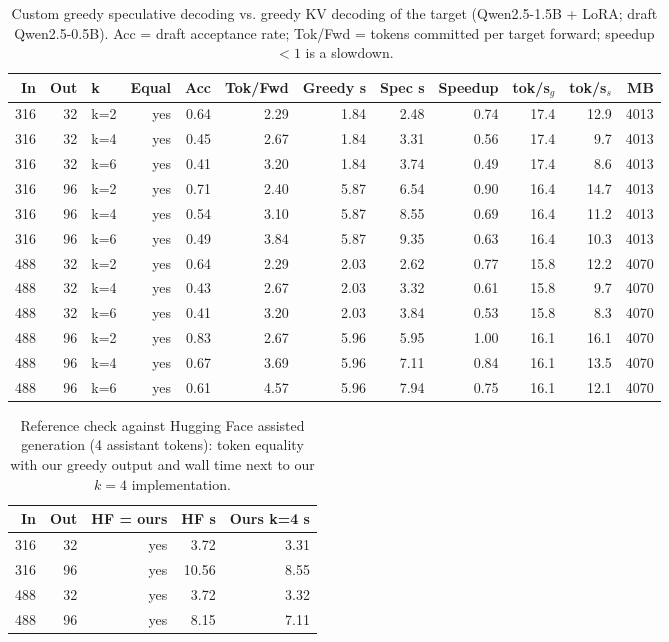 \begin{table}[t]
\centering
\caption{Custom greedy speculative decoding vs. greedy KV decoding of the target (Qwen2.5-1.5B + LoRA; draft Qwen2.5-0.5B). Acc = draft acceptance rate; Tok/Fwd = tokens committed per target forward; speedup $<1$ is a slowdown.}
\label{tab:spec}
\footnotesize
\begin{tabular}{rrlrrrrrrrrr}
\toprule
In & Out & k & Equal & Acc & Tok/Fwd & Greedy s & Spec s & Speedup & tok/s$_g$ & tok/s$_s$ & MB \\
\midrule
316 & 32 & k=2 & yes & 0.64 & 2.29 & 1.84 & 2.48 & 0.74 & 17.4 & 12.9 & 4013 \\
316 & 32 & k=4 & yes & 0.45 & 2.67 & 1.84 & 3.31 & 0.56 & 17.4 & 9.7 & 4013 \\
316 & 32 & k=6 & yes & 0.41 & 3.20 & 1.84 & 3.74 & 0.49 & 17.4 & 8.6 & 4013 \\
316 & 96 & k=2 & yes & 0.71 & 2.40 & 5.87 & 6.54 & 0.90 & 16.4 & 14.7 & 4013 \\
316 & 96 & k=4 & yes & 0.54 & 3.10 & 5.87 & 8.55 & 0.69 & 16.4 & 11.2 & 4013 \\
316 & 96 & k=6 & yes & 0.49 & 3.84 & 5.87 & 9.35 & 0.63 & 16.4 & 10.3 & 4013 \\
488 & 32 & k=2 & yes & 0.64 & 2.29 & 2.03 & 2.62 & 0.77 & 15.8 & 12.2 & 4070 \\
488 & 32 & k=4 & yes & 0.43 & 2.67 & 2.03 & 3.32 & 0.61 & 15.8 & 9.7 & 4070 \\
488 & 32 & k=6 & yes & 0.41 & 3.20 & 2.03 & 3.84 & 0.53 & 15.8 & 8.3 & 4070 \\
488 & 96 & k=2 & yes & 0.83 & 2.67 & 5.96 & 5.95 & 1.00 & 16.1 & 16.1 & 4070 \\
488 & 96 & k=4 & yes & 0.67 & 3.69 & 5.96 & 7.11 & 0.84 & 16.1 & 13.5 & 4070 \\
488 & 96 & k=6 & yes & 0.61 & 4.57 & 5.96 & 7.94 & 0.75 & 16.1 & 12.1 & 4070 \\
\bottomrule
\end{tabular}
\end{table}

\begin{table}[t]
\centering
\caption{Reference check against Hugging Face assisted generation (4 assistant tokens): token equality with our greedy output and wall time next to our $k{=}4$ implementation.}
\label{tab:hf}
\footnotesize
\begin{tabular}{rrrrr}
\toprule
In & Out & HF = ours & HF s & Ours k=4 s \\
\midrule
316 & 32 & yes & 3.72 & 3.31 \\
316 & 96 & yes & 10.56 & 8.55 \\
488 & 32 & yes & 3.72 & 3.32 \\
488 & 96 & yes & 8.15 & 7.11 \\
\bottomrule
\end{tabular}
\end{table}

